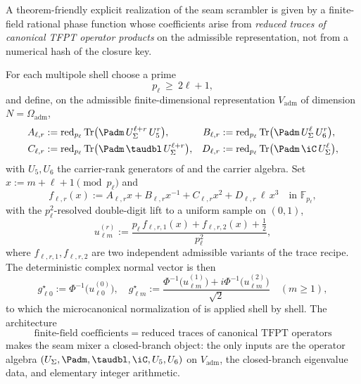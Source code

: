 \begin{remark}
\label{rem:finite-field-seam-mixer}
A theorem-friendly explicit realization of the seam scrambler is given by a finite-field rational
phase function whose coefficients arise from \emph{reduced traces of canonical TFPT operator
products} on the admissible representation, not from a numerical hash of the closure key.

For each multipole shell choose a prime
\[
p_\ell\ \ge\ 2\ell+1,
\]
and define, on the admissible finite-dimensional representation $V_{\mathrm{adm}}$ of dimension
$N=\Omega_{\mathrm{adm}}$,
\begin{align}
A_{\ell,r}
&:=\operatorname{red}_{p_\ell}
\operatorname{Tr}\bigl(\Padm\,U_\Sigma^{\ell+r}\,U_5^{r}\bigr),
&
B_{\ell,r}
&:=\operatorname{red}_{p_\ell}
\operatorname{Tr}\bigl(\Padm\,U_\Sigma^{\ell}\,U_6^{r}\bigr),
\\
C_{\ell,r}
&:=\operatorname{red}_{p_\ell}
\operatorname{Tr}\bigl(\Padm\,\taudbl\,U_\Sigma^{\ell+r}\bigr),
&
D_{\ell,r}
&:=\operatorname{red}_{p_\ell}
\operatorname{Tr}\bigl(\Padm\,\iC\,U_\Sigma^{\ell}\bigr),
\end{align}
with $U_5,U_6$ the carrier-rank generators of  and the carrier
algebra. Set $x:=m+\ell+1\pmod{p_\ell}$ and
\[
f_{\ell,r}(x)
:=
A_{\ell,r}x+B_{\ell,r}x^{-1}+C_{\ell,r}x^2+D_{\ell,r}\,\ell\,x^3
\quad
\text{in }\mathbb F_{p_\ell},
\]
with the $p_\ell^2$-resolved double-digit lift to a uniform sample on $(0,1)$,
\[
u_{\ell m}^{(r)}
:=
\frac{p_\ell\,f_{\ell,r,1}(x)+f_{\ell,r,2}(x)+\tfrac{1}{2}}{p_\ell^2},
\]
where $f_{\ell,r,1},f_{\ell,r,2}$ are two independent admissible variants of the trace recipe.
The deterministic complex normal vector is then
\[
g_{\ell 0}^{\star}:=\Phi^{-1}\!\bigl(u_{\ell 0}^{(0)}\bigr),
\quad
g_{\ell m}^{\star}:=
\frac{\Phi^{-1}\!\bigl(u_{\ell m}^{(1)}\bigr)
+i\Phi^{-1}\!\bigl(u_{\ell m}^{(2)}\bigr)}{\sqrt{2}}
\quad(m\ge1),
\]
to which the microcanonical normalization of  is applied
shell by shell. The architecture
\[
\boxed{\;\text{finite-field coefficients}\;=\;\text{reduced traces of canonical TFPT operators}\;}
\]
makes the seam mixer a closed-branch object: the only inputs are the operator algebra
$(U_\Sigma,\Padm,\taudbl,\iC,U_5,U_6)$ on $V_{\mathrm{adm}}$, the closed-branch eigenvalue data,
and elementary integer arithmetic.
\end{remark}

